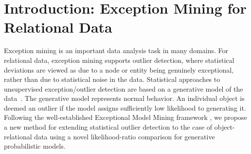 \documentclass[conference]{IEEEtran}
\begin{document}




%
\IEEEpeerreviewmaketitle



\section{Introduction: Exception Mining for Relational Data} 
Exception mining is an important data analysis task in many domains. For relational data, exception mining supports outlier detection, where statistical deviations are viewed as due to a node or entity being genuinely exceptional, rather than due to statistical noise in the data. Statistical approaches to unsupervised exception/outlier detection are based on a generative model of the data~\cite{aggarwal2013}. 
The generative model represents normal behavior. An individual object is deemed an outlier if  the model assigns sufficiently low likelihood to generating it. 
Following the well-established Exceptional Model Mining framework \cite{Duivesteijn2016}, we propose a new method for extending statistical  outlier detection to the case of object-relational data using a novel likelihood-ratio comparison for generative probabilistic models. 
\end{document}
